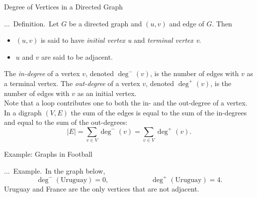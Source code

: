 \documentclass[smaller,hyperref={CJKbookmarks=true}]{beamer}
\newcounter{zhuo}[subsection]
\renewcommand{\thezhuo}{\thesection.\thesubsection.\arabic{zhuo}}
\newenvironment{DEFINITION}{\stepcounter{zhuo}\alert{\thezhuo.~Definition.\,}}{}
\newenvironment{EXAMPLE}{\stepcounter{zhuo}\alert{\!\thezhuo.~Example.\,}}{}
\begin{document}
\begin{frame}[t]{Degree of Vertices in a Directed Graph}
\begin{spacing}{1.15}
\begin{DEFINITION}
Let $G$ be a directed graph and $(u,v)$ and edge of $G$. Then
\begin{itemize}
  \item $(u,v)$ is said to have \emph{initial vertex u} and \emph{terminal vertex v}.
  \item $u$ and $v$ are said to be adjacent.
\end{itemize}
The \emph{in-degree} of a vertex $v$, denoted $\deg^-(v)$, is the number of edges with $v$ as a terminal vertex. The \emph{out-degree} of a vertex $v$, denoted $\deg^+(v)$, is the number of edges with $v$ as an initial vertex.\\[5pt]
Note that a loop contributes one to both the in- and the out-degree of a
vertex.\\[5pt]
In a digraph $(V, E)$ the sum of the edges is equal to the sum of the
in-degrees and equal to the sum of the out-degrees:
\[|E|=\sum_{v\in V}\deg^-(v)=\sum_{v\in V}\deg^+(v).\]
\end{DEFINITION}
\end{spacing}
\end{frame}
\begin{frame}[c]{Example: Graphs in Football}
\begin{spacing}{1.1}
\begin{EXAMPLE}
In the graph below,
\[\deg^-(\text{Uruguay})=0,\qquad\qquad\qquad
\deg^+(\text{Uruguay})=4.\]
Uruguay and France are the only vertices that are not adjacent.
\begin{center}
\end{center}
\end{EXAMPLE}
\end{spacing}
\end{frame}
\end{document}
